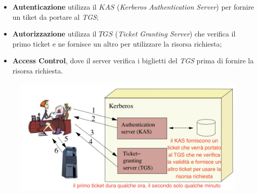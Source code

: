 \documentclass[11pt, a4paper, twoside, italian]{report}
\theoremstyle{plain}
\begin{document}
\begin{multicols}{2}
	\begin{itemize}
		\item \textbf{Autenticazione} utilizza il $KAS$ (\textit{Kerberos Authentication Server}) per fornire un tiket da portare al \textit{TGS};
		\item \textbf{Autorizzazione} utilizza il $TGS$ (\textit{Ticket Granting Server}) che verifica il primo ticket e ne fornisce un altro per utilizzare la risorsa richiesta;
		\item \textbf{Access Control}, dove il server verifica i biglietti del \textit{TGS} prima di fornire la risorsa richiesta.
	\end{itemize}
\columnbreak
	\begin{figure}[H]
		\centering
		\includegraphics[scale=0.55]{kerberos}
	\end{figure}
\end{multicols}
\end{document}
